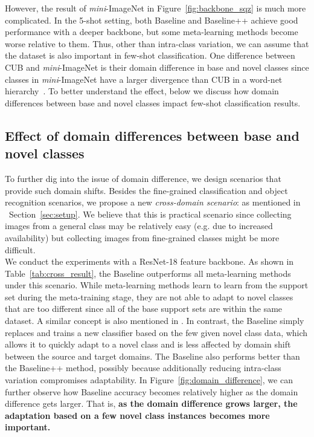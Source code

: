 \documentclass{article}
\newlength\secmargin
\newcommand{\secref}[1]{Section~\ref{sec:#1}}
\newcommand{\figref}[1]{Figure~\ref{fig:#1}}
\newcommand{\tabref}[1]{Table~\ref{tab:#1}}
\def \miniI {\emph{mini}-ImageNet }
\begin{document}
However, the result of \miniI in \figref{backbone_sqz} is much more complicated. In the 5-shot setting, both Baseline and Baseline++ achieve good performance with a deeper backbone, but some meta-learning methods become worse relative to them. Thus, other than intra-class variation, we can assume that the dataset is also important in few-shot classification. One difference between CUB and \miniI is their domain difference in base and novel classes since classes in \miniI have a larger divergence than CUB in a word-net hierarchy~\cite{miller1995wordnet}. To better understand the effect, below we discuss how domain differences between base and novel classes impact few-shot classification results. 




\vspace{\secmargin}
\subsection{Effect of domain differences between base and novel classes}
\label{sec:domaindiff}
To further dig into the issue of domain difference, we design scenarios that provide such domain shifts. Besides the fine-grained classification and object recognition scenarios, we propose a new \emph{cross-domain scenario}: \miniICUB as mentioned in ~\secref{setup}. 
We believe that this is practical scenario since collecting images from a general class may be relatively easy (e.g. due to increased availability) but collecting images from fine-grained classes might be more difficult. \\

We conduct the experiments with a ResNet-18 feature backbone. As shown in \tabref{cross_result}, the Baseline outperforms all meta-learning methods under this scenario. While meta-learning methods learn to learn from the support set during the meta-training stage, they are not able to adapt to novel classes that are too different since all of the base support sets are within the same dataset. A similar concept is also mentioned in \cite{vinyals2016matching}. In contrast, the Baseline simply replaces and trains a new classifier based on the few given novel class data, which allows it to quickly adapt to a novel class and is less affected by domain shift between the source and target domains. The Baseline also performs better than the Baseline++ method, possibly because additionally reducing intra-class variation compromises adaptability. In \figref{domain_difference}, we can further observe how Baseline accuracy becomes relatively higher as the domain difference gets larger. That is, \textbf{as the domain difference grows larger, the adaptation based on a few novel class instances becomes more important.} 
\end{document}
